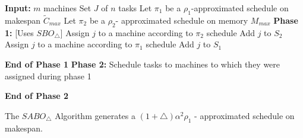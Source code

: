 \documentclass[twocolumn]{svjour3}
\begin{document}
\begin{algorithm}                    
  \caption{$SABO_\triangle$}
  \label{alg2}
  \begin{algorithmic} 
    \State \textbf{Input:} $m$ machines 
    \State \hspace*{15pt}Set $J$ of $n$ tasks
    \State\hspace*{15pt}Let $\pi_1$ be a $ \rho_1$-approximated schedule on makespan $\tilde{C}_{max}$ 
    \State \hspace*{15pt}Let $\pi_2$ be a $\rho_2$- approximated schedule on memory ${M_{max}}$
    \State
    \State \textbf{Phase 1:} [Uses $SBO_\triangle$]
    \State Assign $j$ to a machine according to $\pi_2$ schedule
    \State Add $j$ to $S_2$
    \Else
    \State Assign $j$ to a machine according to $\pi_1$ schedule
    \State Add $j$ to $S_1$   
    \EndIf 
    \EndFor
    
    \State \textbf{End of Phase 1} 
    \State 
    \State \textbf{Phase 2:} 
    \State \hspace*{42pt}Schedule tasks to machines to which they were assigned during phase 1
    
    \State \textbf{End of Phase 2} 
    
  \end{algorithmic}
\end{algorithm}     



\begin{theorem}
  \label{th:chapter5-2a}
  The $SABO_\triangle$ Algorithm generates a $(1+\triangle)\alpha^2
  \rho_1$ - approximated schedule on makespan.
\end{theorem}         
\end{document}
